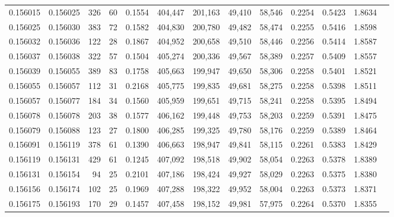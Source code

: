\begin{tabular}{rrrrrrrrrrrrr}
0.156015 & 0.156025 &   326 &  60 &                                     0.1554 & 404,447 & 201,163 &  49,410 &  58,546 & 0.2254 & 0.5423 & 1.8634 \\
0.156025 & 0.156030 &   383 &  72 &                                     0.1582 & 404,830 & 200,780 &  49,482 &  58,474 & 0.2255 & 0.5416 & 1.8598 \\
0.156032 & 0.156036 &   122 &  28 &                                     0.1867 & 404,952 & 200,658 &  49,510 &  58,446 & 0.2256 & 0.5414 & 1.8587 \\
0.156037 & 0.156038 &   322 &  57 &                                     0.1504 & 405,274 & 200,336 &  49,567 &  58,389 & 0.2257 & 0.5409 & 1.8557 \\
0.156039 & 0.156055 &   389 &  83 &                                     0.1758 & 405,663 & 199,947 &  49,650 &  58,306 & 0.2258 & 0.5401 & 1.8521 \\
0.156055 & 0.156057 &   112 &  31 &                                     0.2168 & 405,775 & 199,835 &  49,681 &  58,275 & 0.2258 & 0.5398 & 1.8511 \\
0.156057 & 0.156077 &   184 &  34 &                                     0.1560 & 405,959 & 199,651 &  49,715 &  58,241 & 0.2258 & 0.5395 & 1.8494 \\
0.156078 & 0.156078 &   203 &  38 &                                     0.1577 & 406,162 & 199,448 &  49,753 &  58,203 & 0.2259 & 0.5391 & 1.8475 \\
0.156079 & 0.156088 &   123 &  27 &                                     0.1800 & 406,285 & 199,325 &  49,780 &  58,176 & 0.2259 & 0.5389 & 1.8464 \\
0.156091 & 0.156119 &   378 &  61 &                                     0.1390 & 406,663 & 198,947 &  49,841 &  58,115 & 0.2261 & 0.5383 & 1.8429 \\
0.156119 & 0.156131 &   429 &  61 &                                     0.1245 & 407,092 & 198,518 &  49,902 &  58,054 & 0.2263 & 0.5378 & 1.8389 \\
0.156131 & 0.156154 &    94 &  25 &                                     0.2101 & 407,186 & 198,424 &  49,927 &  58,029 & 0.2263 & 0.5375 & 1.8380 \\
0.156156 & 0.156174 &   102 &  25 &                                     0.1969 & 407,288 & 198,322 &  49,952 &  58,004 & 0.2263 & 0.5373 & 1.8371 \\
0.156175 & 0.156193 &   170 &  29 &                                     0.1457 & 407,458 & 198,152 &  49,981 &  57,975 & 0.2264 & 0.5370 & 1.8355 \\

\end{tabular}
